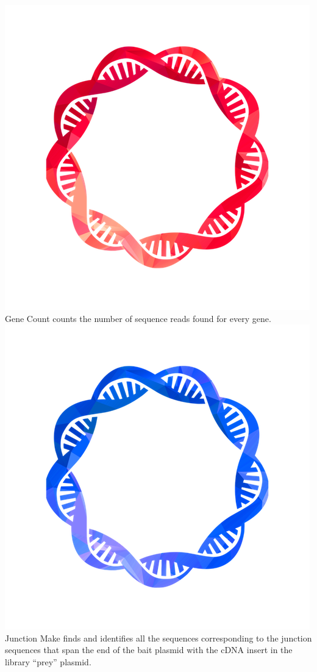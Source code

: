 \documentclass[11pt,fleqn]{book} %
\newcommand{\GeneCount}{{\color{Red} Gene Count }}
\newcommand{\JunctionMake}{{\color{Blue} Junction Make }}
\begin{document}
\includegraphics[scale=0.3]{Pictures/gene_count.png} \GeneCount counts the number of sequence reads found for every gene.\\

\includegraphics[scale=0.3]{Pictures/junction_make.png} \JunctionMake finds and identifies all the sequences corresponding to the junction sequences that span the end of the bait plasmid with the cDNA insert in the library “prey” plasmid.\\
\end{document}
